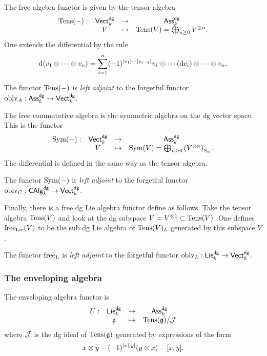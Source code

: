 \documentclass[11pt]{amsart}
\def\dgVect{{\sf Vect}^{\sf dg}}
\def\dgLie{{\sf Lie}^{\sf dg}}
\def\dgAss{{\sf Ass}^{\sf dg}}
\def\dgCAlg{{\sf CAlg}^{\sf dg}}
\begin{document}
The free algebra functor is given by the tensor algebra 
\[
\begin{array}{cccc}
\Tens(-) : & \dgVect_k & \to & \dgAss_k \\
& V & \mapsto & \Tens(V) = \bigoplus_{n \geq 0} V^{\tensor n} . 
\end{array}
\]
One extends the differential by the rule
\[
{\rm d}(v_1 \otimes \cdots \otimes v_n) = \sum_{i = 1}^n (-1)^{|v_1|\cdots |v_{i-1}|} v_1 \otimes \cdots ({\rm d} v_{i}) \otimes \cdots \otimes v_n .
\]

\begin{fact}
The functor ${\rm Tens}(-)$ is {\em left adjoint} to the forgetful functor $\oblv_A : \dgAss_k \to \dgVect_k$. 
\end{fact}

The free commutative algebra is the symmetric algebra on the dg vector space. 
This is the functor
\[
\begin{array}{cccc}
\Sym(-) : & \dgVect_k & \to & \dgAss_k \\
& V & \mapsto & \Sym (V) = \bigoplus_{n \geq 0} \left(V^{\tensor n}\right)_{S_n} . 
\end{array}
\]
The differential is defined in the same way as the tensor algebra. 

\begin{fact}
The functor ${\rm Sym}(-)$ is {\em left adjoint} to the forgetful functor $\oblv_C : \dgCAlg_k \to \dgVect_k$.
\end{fact}

Finally, there is a free dg Lie algebra functor define as follows. 
Take the tensor algebra ${\rm Tens}(V)$ and look at the dg subspace $V = V^{\otimes 1} \subset {\rm Tens}(V)$. 
One defines ${\rm free}_{\rm Lie}(V)$ to be the sub dg Lie algebra of ${\rm Tens}(V)_L$ generated by this subspace $V$. 

\begin{fact} The functor ${\rm free}_{\rm L}$ is {\em left adjoint} to the forgetful functor $\oblv_L : \dgLie_k \to \dgVect_k$. 
\end{fact}
\subsubsection{The enveloping algebra}

The enveloping algebra functor is
\[
\begin{array}{cccc}
U : & \dgLie_k & \to & \dgAss_k \\
& \fg & \mapsto & \Tens(\fg) / \cJ
\end{array}
\]
where $\mathcal J$ is the dg ideal of ${\rm Tens}(\mathfrak g)$ generated by expressions of the form 
\[
x \otimes y - (-1)^{|x||y|} (y \otimes x) - [x,y].
\]
\end{document}
